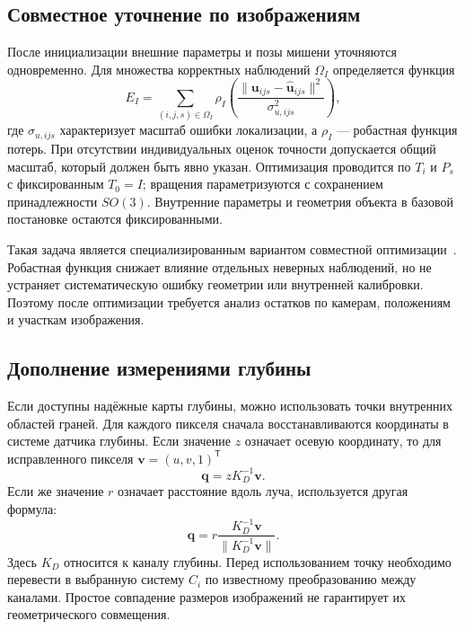 \subsection{Совместное уточнение по изображениям}

После инициализации внешние параметры и позы мишени уточняются одновременно. Для множества корректных наблюдений $\Omega_I$ определяется функция
\begin{equation}
  E_I=\sum_{(i,j,s)\in\Omega_I}
  \rho_I\!\left(
    \frac{\|\mathbf u_{ijs}-\widehat{\mathbf u}_{ijs}\|^2}
         {\sigma_{u,ijs}^2}
  \right),
  \label{eq:imagecost}
\end{equation}
где $\sigma_{u,ijs}$ характеризует масштаб ошибки локализации, а $\rho_I$ --- робастная функция потерь. При отсутствии индивидуальных оценок точности допускается общий масштаб, который должен быть явно указан. Оптимизация проводится по $T_i$ и $P_s$ с фиксированным $T_0=I$; вращения параметризуются с сохранением принадлежности $SO(3)$. Внутренние параметры и геометрия объекта в базовой постановке остаются фиксированными.

Такая задача является специализированным вариантом совместной оптимизации~\cite{triggs2000}. Робастная функция снижает влияние отдельных неверных наблюдений, но не устраняет систематическую ошибку геометрии или внутренней калибровки. Поэтому после оптимизации требуется анализ остатков по камерам, положениям и участкам изображения.

\subsection{Дополнение измерениями глубины}

Если доступны надёжные карты глубины, можно использовать точки внутренних областей граней. Для каждого пикселя сначала восстанавливаются координаты в системе датчика глубины. Если значение $z$ означает осевую координату, то для исправленного пикселя $\mathbf v=(u,v,1)^\mathsf T$
\begin{equation}
  \mathbf q=zK_D^{-1}\mathbf v.
\end{equation}
Если же значение $r$ означает расстояние вдоль луча, используется другая формула:
\begin{equation}
  \mathbf q=r\frac{K_D^{-1}\mathbf v}
                       {\|K_D^{-1}\mathbf v\|}.
\end{equation}
Здесь $K_D$ относится к каналу глубины. Перед использованием точку необходимо перевести в выбранную систему $C_i$ по известному преобразованию между каналами. Простое совпадение размеров изображений не гарантирует их геометрического совмещения.

